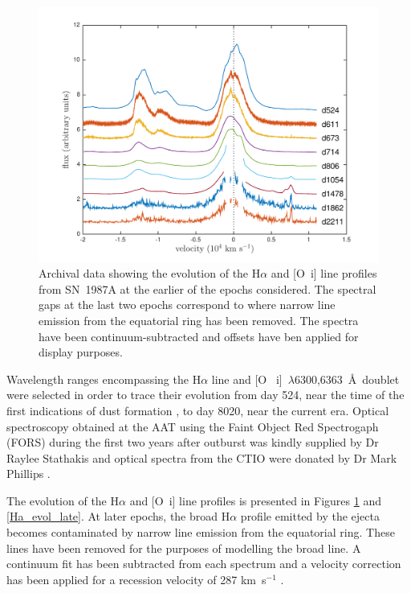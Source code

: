 \begin{figure}
\centering
\includegraphics[trim =39 10 45 15,clip=true,scale=0.8]{chapters/chapter5/images/Ha_evol_early_1col2.pdf}
\caption{Archival data showing the evolution of the H$\alpha$ and
[O~{\sc i}] line profiles from SN~1987A at the earlier of the epochs considered. The 
spectral gaps at the last two epochs correspond to where narrow line 
emission from the equatorial ring has been removed. The spectra have been
continuum-subtracted and offsets have ben applied for display purposes.}
\label{Ha_evol_early}
\end{figure}


Wavelength ranges encompassing the H$\alpha$ line and [O~{\sc 
i}]~$\lambda$6300,6363~\AA\ doublet were selected in order to trace their 
evolution from day 524, near the time of the first indications of dust 
formation \citep{Wooden1993}, to day 8020, near the current era. Optical 
spectroscopy obtained at the AAT using the Faint Object Red Spectrogaph 
(FORS) during the first two years after outburst was kindly supplied by Dr 
Raylee Stathakis \citep{Spyromilio1991, Spyromilio1993, Hanuschik1993} and 
optical spectra from the CTIO were donated by Dr Mark Phillips 
\citep{Suntzeff1991}.

The evolution of the H$\alpha$ and [O~{\sc i}] line profiles is presented 
in Figures \ref{Ha_evol_early} and \ref{Ha_evol_late}.  At later epochs, 
the broad H$\alpha$ profile emitted by the ejecta becomes contaminated by 
narrow line emission from the equatorial ring.  These lines have been 
removed for the purposes of modelling the broad line. A continuum fit has 
been subtracted from each spectrum and a velocity correction has been 
applied for a recession velocity of 287 km~s$^{-1}$ 
\citep{Groningsson2008}.

